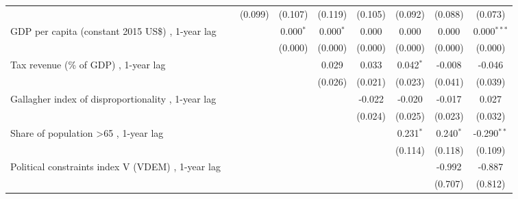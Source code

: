 \begin{table}[htbp]
\begin{tabular}{lcccccccc}
                                                                                        &               & (0.099)       & (0.107)      & (0.119)     & (0.105) & (0.092)      & (0.088)     & (0.073)\\   
      GDP per capita (constant 2015 US\$) , 1-year lag                                  &               &               & 0.000$^{*}$  & 0.000$^{*}$ & 0.000   & 0.000        & 0.000       & 0.000$^{***}$\\   
                                                                                        &               &               & (0.000)      & (0.000)     & (0.000) & (0.000)      & (0.000)     & (0.000)\\   
      Tax revenue (\% of GDP) , 1-year lag                                              &               &               &              & 0.029       & 0.033   & 0.042$^{*}$  & -0.008      & -0.046\\   
                                                                                        &               &               &              & (0.026)     & (0.021) & (0.023)      & (0.041)     & (0.039)\\   
      Gallagher index of disproportionality , 1-year lag                                &               &               &              &             & -0.022  & -0.020       & -0.017      & 0.027\\   
                                                                                        &               &               &              &             & (0.024) & (0.025)      & (0.023)     & (0.032)\\   
      Share of population >65 , 1-year lag                                              &               &               &              &             &         & 0.231$^{*}$  & 0.240$^{*}$ & -0.290$^{**}$\\   
                                                                                        &               &               &              &             &         & (0.114)      & (0.118)     & (0.109)\\   
      Political constraints index V (VDEM) , 1-year lag                                 &               &               &              &             &         &              & -0.992      & -0.887\\   
                                                                                        &               &               &              &             &         &              & (0.707)     & (0.812)\\   

\end{tabular}
\end{table}
